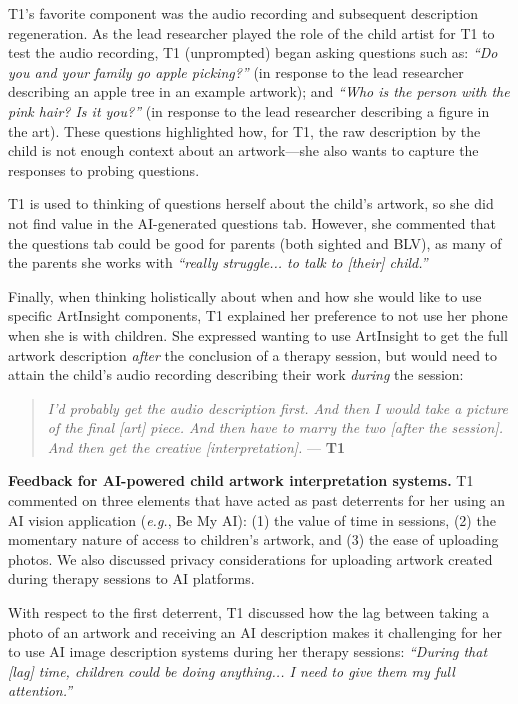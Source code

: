 \documentclass[sigconf]{acmart}
\begin{document}
T1's favorite component was the audio recording and subsequent description regeneration. As the lead researcher played the role of the child artist for T1 to test the audio recording, T1 (unprompted) began asking questions such as: \textit{``Do you and your family go apple picking?''} (in response to the lead researcher describing an apple tree in an example artwork); and \textit{``Who is the person with the pink hair? Is it you?''} (in response to the lead researcher describing a figure in the art). These questions highlighted how, for T1, the raw description by the child is not enough context about an artwork---she also wants to capture the responses to probing questions.

T1 is used to thinking of questions herself about the child's artwork, so she did not find value in the AI-generated questions tab. However, she commented that the questions tab could be good for parents (both sighted and BLV), as many of the parents she works with \textit{``really struggle... to talk to [their] child.''}

Finally, when thinking holistically about when and how she would like to use specific ArtInsight components, T1 explained her preference to not use her phone when she is with children. She expressed wanting to use ArtInsight to get the full artwork description \textit{after} the conclusion of a therapy session, but would need to attain the child's audio recording describing their work \textit{during} the session:

\begin{quote}
    \textit{I'd probably get the audio description first. And then I would take a picture of the final [art] piece. And then have to marry the two [after the session]. And then get the creative [interpretation].} --- \textbf{T1}
\end{quote}

\textbf{Feedback for AI-powered child artwork interpretation systems.} 
T1 commented on three elements that have acted as past deterrents for her using an AI vision application (\textit{e.g.},  Be My AI): (1) the value of time in sessions, (2) the momentary nature of access to children's artwork, and (3) the ease of uploading photos. We also discussed privacy considerations for uploading artwork created during therapy sessions to AI platforms.

With respect to the first deterrent, T1 discussed how the lag between taking a photo of an artwork and receiving an AI description makes it challenging for her to use AI image description systems during her therapy sessions: \textit{``During that [lag] time, children could be doing anything... I need to give them my full attention.''}
\end{document}
